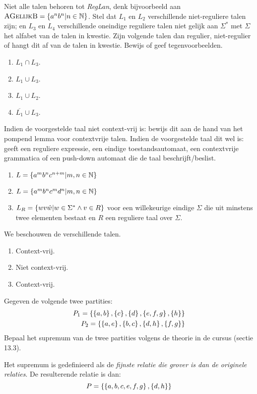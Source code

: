 \documentclass{article}
\newcommand{\lang}[1]{\textsc{#1}}
\begin{document}
\begin{question}
Niet alle talen behoren tot \emph{RegLan}, denk bijvoorbeeld aan $\lang{AGelijkB}=\accl{a^nb^n|n\in\NN}$. Stel dat $L_1$
en $L_2$ verschillende niet-reguliere talen zijn; en $L_3$ en $L_4$ verschillende oneindige reguliere talen niet gelijk
aan $\Sigma^*$ met $\Sigma$ het alfabet van de talen in kwestie. Zijn volgende talen dan regulier, niet-regulier of
hangt dit af van de talen in kwestie. Bewijs of geef tegenvoorbeelden.
\begin{enumerate}
 \item $L_1\cap L_3$.
 \item $L_1\cup L_3$.
 \item $L_1\cup L_2$.
 \item $\overline{L_1}\cup L_3$.
\end{enumerate}
\end{question}

\begin{question}
Indien de voorgestelde taal niet context-vrij is: bewijs dit aan de hand van het pompend lemma voor contextvrije talen.
Indien de voorgestelde taal dit wel is: geeft een reguliere expressie, een eindige toestandsautomaat, een contextvrije
grammatica of een push-down automaat die de taal beschrijft/beslist.
\begin{enumerate}
 \item $L=\left\{ a^mb^nc^{n+m}|m,n\in\mathbb{N} \right\}$
 \item $L=\left\{ a^mb^nc^md^n|m,n\in\mathbb{N} \right\}$
 \item $L_R=\left\{ wv\hat{w}|w\in\Sigma^*\wedge v\in R \right\}$ voor een willekeurige eindige $\Sigma$ die uit minstens twee
elementen bestaat en $R$ een reguliere taal over $\Sigma$.
\end{enumerate}
\end{question}
\begin{answer}
We beschouwen de verschillende talen.
\begin{enumerate}
 \item Context-vrij.
 \item Niet context-vrij.
 \item Context-vrij.
\end{enumerate}
\end{answer}
\begin{question}
Gegeven de volgende twee partities:
\begin{eqnarray}
P_1=\left\{ \left\{ a,b \right\},\left\{ c \right\},\left\{ d \right\},\left\{ e,f,g \right\},\left\{ h \right\}  \right\}\\
P_2=\left\{ \left\{ a,e \right\},\left\{ b,c \right\},\left\{ d,h \right\},\left\{ f,g \right\}  \right\}
\end{eqnarray}
Bepaal het supremum van de twee partities volgens de theorie in de cursus (sectie 13.3).
\end{question}
\begin{answer}
Het supremum is gedefinieerd als de \emph{fijnste relatie die grover is dan de originele relaties}. De resulterende relatie is dan:
\begin{equation}
P=\left\{ \left\{ a,b,c,e,f,g \right\},\left\{ d,h \right\}  \right\}
\end{equation}
\end{answer}
\end{document}
